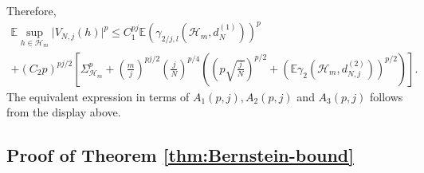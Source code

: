 \documentclass[12pt]{article}
\def\l{\left}
\def\r{\right}
\newcommand{\m}{\mathcal}
\newcommand{\mb}{\mathbb}
\newcommand{\scolor}[1]{\textcolor{red}{#1}} %
\theoremstyle{thmstyletwo}%
\theoremstyle{thmstylethree}%
\begin{document}
    Therefore,
    \begin{multline*}
        \mb E \sup_{h \in \mathcal{H}_m} \lvert V_{N,j}(h) \rvert ^ p \leq  
        C_1^{pj} \mb E \l(\gamma_{2/j, l}\l(\mathcal{H}_m, d^{(1)}_N\r)\r)^p 
        \\
        +(C_2 p)^{pj/2} \l[\Sigma^p_{\m H_m} 
        + \l(\frac{m}{j}\r)^{pj/2}\l(\frac{j}{N}\r)^{p/4} \l( \l(p\sqrt{\frac{j}{N}}\r)^{p/2} + \l(\mb E \gamma_2 (\mathcal{H}_m, d^{(2)}_{N,j})\r)^{p/2}\r)\r].
    \end{multline*}
    The equivalent expression in terms of $A_1(p,j),A_2(p,j)$ and $A_3(p,j)$ follows from the display above.



\subsection{Proof of Theorem \ref{thm:Bernstein-bound}}
\label{section:proof:bernstein-bound}
\end{document}
